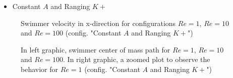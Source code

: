 \begin{itemize}
  \item Constant $A$ and Ranging $K+$
\end{itemize}

\begin{figure}[H]
\centering
  \begin{footnotesize}
  
  \caption[Swimmer velocity in x-direction for configurations $Re=1$, $Re=10$ and $Re=100$ (config. "Constant $A$ and Ranging $K+$")]{Swimmer velocity in x-direction for configurations $Re=1$, $Re=10$ and $Re=100$  (config. "Constant $A$ and Ranging $K+$")}
   \label{fig:Bild4.28}
  \end{footnotesize}
\end{figure}



\begin{figure}[H]
\centering
\begin{subfigure}
\centering
  \begin{footnotesize}
  
  \end{footnotesize}
\end{subfigure}
\begin{subfigure}%
  \centering
  \begin{footnotesize}
  
  \end{footnotesize}
\end{subfigure}
   \caption[In left graphic, swimmer center of mass path for $Re=1$, $Re=10$ and $Re=100$. In right graphic, a zoomed plot to observe the behavior for $Re=1$ (config. "Constant $A$ and Ranging $K+$")]{In left graphic, swimmer center of mass path for $Re=1$, $Re=10$ and $Re=100$. In right graphic, a zoomed plot to observe the behavior for $Re=1$ (config. "Constant $A$ and Ranging $K+$")}
   \label{fig:Bild4.29}
\end{figure}


